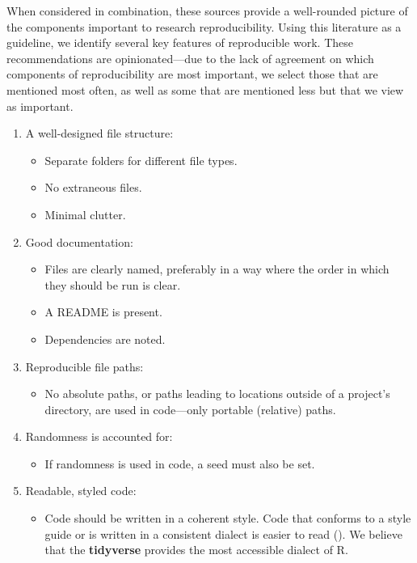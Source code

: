 \documentclass[APA,LATO1COL]{WileyNJD-v2}\usepackage[]{graphicx}\usepackage[]{color}
\newcommand{\R}{\textsf{R}\xspace}
\newcommand{\pkg}[1]{\textbf{#1}}
\begin{document}
When considered in combination, these sources provide a well-rounded picture of the components important to research reproducibility. Using this literature as a guideline, we identify several key features of reproducible work. These recommendations are opinionated---due to the lack of agreement on which components of reproducibility are most important, we select those that are mentioned most often, as well as some that are mentioned less but that we view as important. 
\vspace{3mm}

\begin{enumerate} [nolistsep]
\item A well-designed file structure:
  \begin{itemize}[noitemsep]
  \item Separate folders for different file types.
  \item No extraneous files.
  \item Minimal clutter.
  \end{itemize}
\item Good documentation:
  \begin{itemize} [noitemsep]
  \item Files are clearly named, preferably in a way where the order in which they should be run is clear.
  \item A README is present.
  \item Dependencies are noted.
  \end{itemize}
\item Reproducible file paths:
  \begin{itemize}
  \item No absolute paths, or paths leading to locations outside of a project's directory, are used in code---only portable (relative) paths.
  \end{itemize}
\item Randomness is accounted for:
  \begin{itemize}
  \item If randomness is used in code, a seed must also be set.
  \end{itemize}
\item Readable, styled code:
  \begin{itemize}
  \item Code should be written in a coherent style. Code that conforms to a style guide or is written in a consistent dialect is easier to read (\cite{hermans2017programming}). We believe that the \pkg{tidyverse} provides the most accessible dialect of \R.
  \end{itemize}
\end{enumerate}
\end{document}
